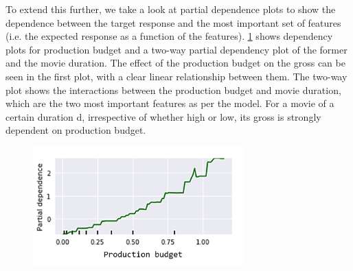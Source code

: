 To extend this further, we take a look at partial dependence plots to show the dependence between the target response and the most important set of features (i.e. the expected response as a function of the features). \figurename{} \ref{fig:gradient_boost_dependency} shows dependency plots for production budget and a two-way partial dependency plot of the former and the movie duration. The effect of the production budget on the gross can be seen in the first plot, with a clear linear relationship between them. The two-way plot shows the interactions between the production budget and movie duration, which are the two most important features as per the model. For a movie of a certain duration d, irrespective of whether high or low, its gross is strongly dependent on production budget.

\begin{figure}[h]
\centering
\includegraphics[width=3.2in]{figures/gb_dependency_3}
\label{fig:gradient_boost_dependency}
\end{figure}
